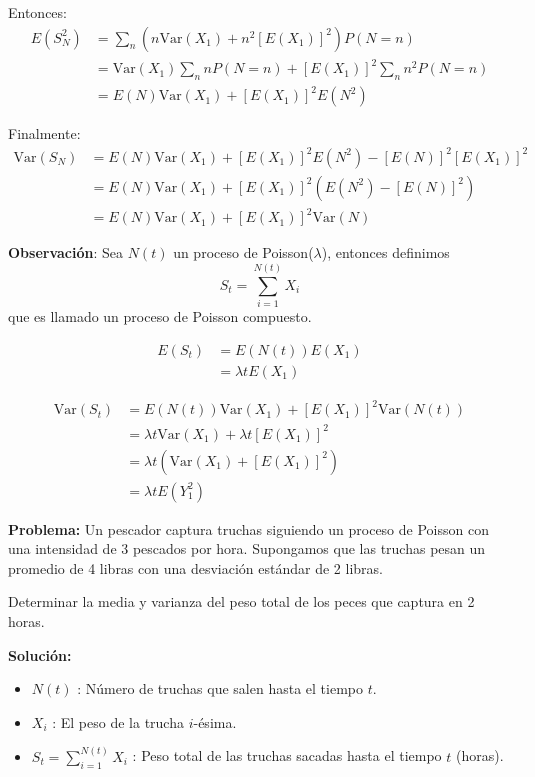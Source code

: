 \documentclass[12pt,a4paper]{article}
\begin{document}
Entonces:
\begin{align*}
E(S_N^2) &= \sum_n \left(n\text{Var}(X_1) + n^2[E(X_1)]^2\right) P(N=n) \\
&= \text{Var}(X_1) \sum_n n P(N=n) + [E(X_1)]^2 \sum_n n^2 P(N=n) \\
&= E(N)\text{Var}(X_1) + [E(X_1)]^2 E(N^2)
\end{align*}

Finalmente:
\begin{align*}
\text{Var}(S_N) &= E(N)\text{Var}(X_1) + [E(X_1)]^2 E(N^2) - [E(N)]^2[E(X_1)]^2 \\
&= E(N)\text{Var}(X_1) + [E(X_1)]^2\left(E(N^2) - [E(N)]^2\right) \\
&= E(N)\text{Var}(X_1) + [E(X_1)]^2\text{Var}(N)
\end{align*}

\textbf{Observación}: Sea $N(t)$ un proceso de Poisson($\lambda$), entonces definimos 
\begin{equation*}
S_t = \sum_{i=1}^{N(t)} X_i
\end{equation*}
que es llamado un proceso de Poisson compuesto.

\begin{align*}
E(S_t) &= E(N(t)) E(X_1) \\
&= \lambda t E(X_1)
\end{align*}

\begin{align*}
\text{Var}(S_t) &= E(N(t))\text{Var}(X_1) + [E(X_1)]^2\text{Var}(N(t)) \\
&= \lambda t \text{Var}(X_1) + \lambda t [E(X_1)]^2 \\
&= \lambda t \left(\text{Var}(X_1) + [E(X_1)]^2\right) \\
&= \lambda t E(Y_1^2)
\end{align*}

\textbf{Problema:} Un pescador captura truchas siguiendo un proceso de Poisson con una intensidad de 3 pescados por hora. Supongamos que las truchas pesan un promedio de 4 libras con una desviación estándar de 2 libras.

Determinar la media y varianza del peso total de los peces que captura en 2 horas.

\textbf{Solución:}

\begin{itemize}
    \item $N(t)$ : Número de truchas que salen hasta el tiempo $t$.
    \item $X_i$ : El peso de la trucha $i$-ésima.
    \item $S_t = \sum_{i=1}^{N(t)} X_i$ : Peso total de las truchas sacadas hasta el tiempo $t$ (horas).
\end{itemize}
\end{document}
